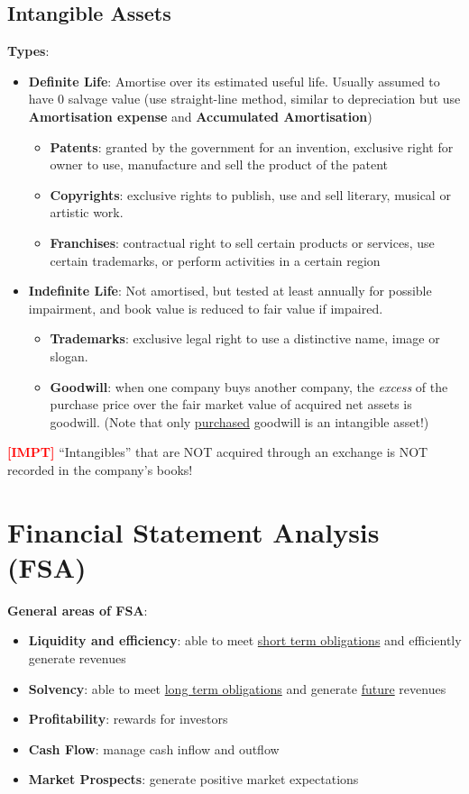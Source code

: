 \documentclass{article}
\newcommand{\impt}[0]{\textcolor{red}{\textbf{[IMPT] }}}
\begin{document}
\begin{multicols}{2}
\subsection{Intangible Assets}
\textbf{Types}:
\begin{itemize}
	\item \textbf{Definite Life}: Amortise over its estimated useful life. Usually assumed to have 0 salvage value (use straight-line method, similar to depreciation but use \textbf{Amortisation expense} and \textbf{Accumulated Amortisation})
	\begin{itemize}
		\item \textbf{Patents}: granted by the government for an invention, exclusive right for owner to use, manufacture and sell the product of the patent
		\item \textbf{Copyrights}: exclusive rights to publish, use and sell literary, musical or artistic work.
		\item \textbf{Franchises}: contractual right to sell certain products or services, use certain trademarks, or perform activities in a certain region
	\end{itemize}
    \item \textbf{Indefinite Life}: Not amortised, but tested at least annually for possible impairment, and book value is reduced to fair value if impaired.
    \begin{itemize}
    	\item \textbf{Trademarks}: exclusive legal right to use a distinctive name, image or slogan.
    	\item \textbf{Goodwill}: when one company buys another company, the \textit{excess} of the purchase price over the fair market value of acquired net assets is goodwill. (Note that only \underline{purchased} goodwill is an intangible asset!)
    \end{itemize}
\end{itemize}
\impt “Intangibles” that are NOT acquired through an exchange is NOT recorded in the company’s books!

\section{Financial Statement Analysis (FSA)}
\textbf{General areas of FSA}:
\begin{itemize}
	\item \textbf{Liquidity and efficiency}: able to meet \underline{short term obligations} and efficiently generate revenues
	\item \textbf{Solvency}: able to meet \underline{long term obligations} and generate \underline{future} revenues
	\item \textbf{Profitability}: rewards for investors
	\item \textbf{Cash Flow}: manage cash inflow and outflow
	\item \textbf{Market Prospects}: generate positive market expectations
\end{itemize}


\end{multicols}
\end{document}
